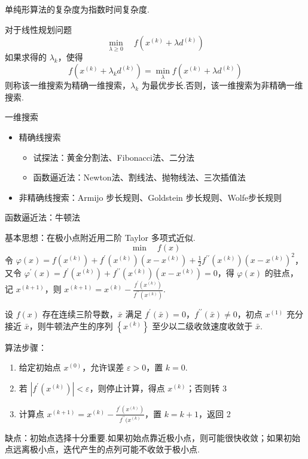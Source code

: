 \begin{remark}
    单纯形算法的复杂度为指数时间复杂度.
\end{remark}

\begin{remark}
    对于线性规划问题 \[\min_{\lambda \ge 0} \quad f(x^{(k)} + \lambda d^{(k)})\] 如果求得的 $\lambda_k$，使得 \[f(x^{(k)} + \lambda_kd^{(k)}) = \min_\lambda f(x^{(k)} + \lambda d^{(k)})\]则称该一维搜索为精确一维搜索，$\lambda_k$ 为最优步长.否则，该一维搜索为非精确一维搜索.
\end{remark}

\begin{remark}
    一维搜索\begin{itemize}
        \item 精确线搜索\begin{itemize}
            \item 试探法：黄金分割法、Fibonacci法、二分法
            \item 函数逼近法：Newton法、割线法、抛物线法、三次插值法
        \end{itemize}
        \item 非精确线搜索：Armijo 步长规则、Goldstein 步长规则、Wolfe步长规则
    \end{itemize}
\end{remark}

\begin{remark}
    函数逼近法：牛顿法

    基本思想：在极小点附近用二阶 Taylor 多项式近似. \[\min \quad f(x)\]
    令 $\varphi(x)=f\left(x^{(k)}\right)+f^{\prime}\left(x^{(k)}\right)\left(x-x^{(k)}\right)+\frac{1}{2} f^{\prime \prime}\left(x^{(k)}\right)\left(x-x^{(k)}\right)^{2}$，又令 $\varphi^{\prime}(x)=f^{\prime}\left(x^{(k)}\right)+f^{\prime \prime}\left(x^{(k)}\right)\left(x-x^{(k)}\right)=0$，得 $\varphi(x)$ 的驻点，记 $x^{(k + 1)}$，则 $x^{(k+1)}=x^{(k)}-\frac{f^{\prime}\left(x^{(k)}\right)}{f^{\prime \prime}\left(x^{(k)}\right)}$.

    \begin{theorem}
        设 $f(x)$ 存在连续三阶导数，$\bar{x}$ 满足 $f^\prime(\bar{x}) = 0$，$f^{\prime\prime}(\bar{x}) \neq 0$，初点 $x^{(1)}$ 充分接近 $\bar{x}$，则牛顿法产生的序列 $\left\{x^{(k)}\right\}$ 至少以二级收敛速度收敛于 $\bar{x}$.
    \end{theorem}

    算法步骤：\begin{enumerate}
        \item 给定初始点 $x^{(0)}$，允许误差 $\varepsilon > 0$，置 $k = 0$.
        \item 若 $|f^\prime(x^{(k)})| < \varepsilon$，则停止计算，得点 $x^{(k)}$；否则转 3
        \item 计算点 $x^{(k + 1)} = x^{(k)} - \frac{f^\prime(x^{(k)})}{f^{\prime\prime}(x^{(k)}}$，置 $k = k + 1$，返回 2
    \end{enumerate}

    缺点：初始点选择十分重要.如果初始点靠近极小点，则可能很快收敛；如果初始点远离极小点，迭代产生的点列可能不收敛于极小点.
\end{remark}


